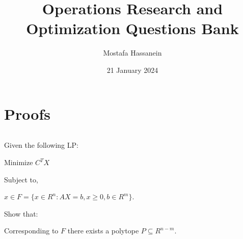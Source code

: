 \documentclass{article}
\author{Mostafa Hassanein}
\title{Operations Research and Optimization Questions Bank}
\date{21 January 2024}
\begin{document}
\maketitle

\newpage

\newcommand*\numcircledmod[1]{\raisebox{.5pt}{\textcircled{\raisebox{-.9pt} {#1}}}}

\newcommand*\numcircledtikz[1]{\tikz[baseline=(char.base)]{
            \node[shape=circle,draw,inner sep=1.2pt] (char) {#1};}} 

\newtheorem{innercustomthm}{Theorem}
\newenvironment{customthm}[1]
  {\renewcommand\theinnercustomthm{#1}\innercustomthm}
  {\endinnercustomthm}

\section*{Proofs}

\begin{customthm}{1}
  $ $

  Given the following LP: 
  
  \qquad Minimize $C^TX$ 
  
  Subject to, 
  
  \qquad $x \in F = \{x \in R^n: AX=b, x\geq 0, b\in R^m \}$.
  \newline

  Show that:

  \qquad Corresponding to $F$ there exists a polytope $P \subseteq R^{n-m}$.

\end{customthm}
\end{document}
